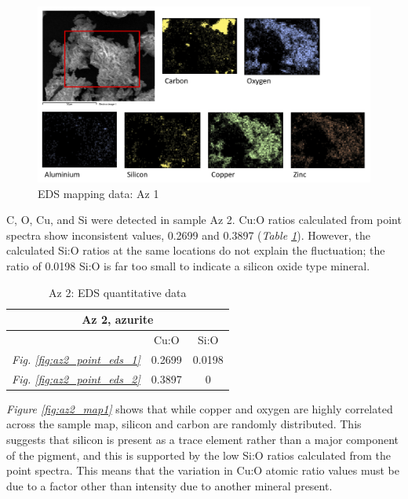 \begin{figure}[H]
\centering
  \includegraphics[width=0.9\linewidth]{Az1_EDS_map2_250221_img}
\caption[EDS mapping data: Az 1]{EDS mapping data: Az 1}
\label{fig:az1_map1}
\end{figure}



C, O, Cu, and Si were detected in sample Az 2. Cu:O ratios calculated from point spectra show inconsistent values, 0.2699 and 0.3897 (\textit{Table \ref{table:az2_ratios}}). However, the calculated Si:O ratios at the same locations do not explain the fluctuation; the ratio of 0.0198 Si:O is far too small to indicate a silicon oxide type mineral.

\begin{table}[H]
\caption{Az 2: EDS quantitative data}
\centering
\label{table:az2_ratios}
\begin{tabular}{c c c}
\toprule
\multicolumn{3}{c}{Az 2, azurite} \\
\midrule
~ & Cu:O & Si:O \\
\midrule
\textit{Fig. \ref{fig:az2_point_eds_1}} & 0.2699 & 0.0198 \\
\textit{Fig. \ref{fig:az2_point_eds_2}} & 0.3897 & 0 \\
\bottomrule
\end{tabular}
\end{table}

\textit{Figure \ref{fig:az2_map1}} shows that while copper and oxygen are highly correlated across the sample map, silicon and carbon are randomly distributed. This suggests that silicon is present as a trace element rather than a major component of the pigment, and this is supported by the low Si:O ratios calculated from the point spectra. This means that the variation in Cu:O atomic ratio values must be due to a factor other than intensity due to another mineral present.


